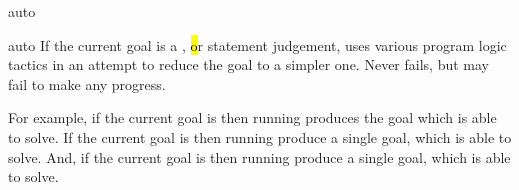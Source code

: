 \begin{tactic}{auto}
  \begin{tsyntax}[empty]{auto}
    If the current goal is a \prhl, \hl or \phl statement judgement,
    uses various program logic tactics in an attempt to reduce the
    goal to a simpler one. Never fails, but may fail to make any
    progress.


    \medskip For example, if the current goal is
     then
    running 
    produces the goal
    which  is able to solve.
    If the current goal is
     then
    running 
    produce a single goal, which  is able to solve.
    And, if the current goal is
     then
    running 
    produce a single goal, which  is able to solve.
  \end{tsyntax}
\end{tactic}
